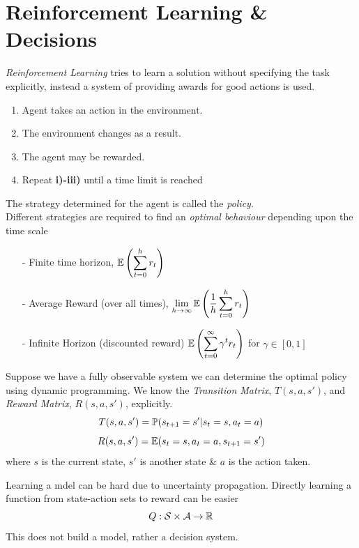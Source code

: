 \documentclass[11pt,a4paper]{article}
\begin{document}
\section{Reinforcement Learning \& Decisions}

\textit{Reinforcement Learning} tries to learn a solution without specifying the task explicitly, instead a system of providing awards for good actions is used.\\

\begin{enumerate}[label=\roman*)]
	\item Agent takes an action in the environment.
	\item The environment changes as a result.
	\item The agent may be rewarded.
	\item Repeat \textbf{i)-iii)} until a time limit is reached
\end{enumerate}
\nb The strategy determined for the agent is called the \textit{policy}.\\

Different strategies are required to find an \textit{optimal behaviour} depending upon the time scale
\begin{itemize}
	\item[-] Finite time horizon, ${\displaystyle\mathbb{E}\left(\sum_{t=0}^hr_t\right)}$
	\item[-] Average Reward (over all times), ${\displaystyle\lim_{h\to\infty}\mathbb{E}\left(\frac{1}{h}\sum_{t=0}^hr_t\right)}$
	\item[-] Infinite Horizon (discounted reward) ${\displaystyle\mathbb{E}\left(\sum_{t=0}^\infty\gamma^tr_t\right)}$ for $\gamma\in[0,1]$
\end{itemize}

Suppose we have a fully observable system we can determine the optimal policy using dynamic programming. \ie We know the \textit{Transition Matrix}, $T(s,a,s')$, and \textit{Reward Matrix}, $R(s,a,s')$, explicitly.
$$T(s,a,s')=\mathbb{P}(s_{t+1}=s'|s_t=s,a_t=a)$$
$$R(s,a,s')=\mathbb{E}(s_t=s,a_t=a,s_{t+1}=s')$$
where $s$ is the current state, $s'$ is another state \& $a$ is the action taken.\\


Learning a mdel can be hard due to uncertainty propagation. Directly learning a function from state-action sets to reward can be easier
$$Q:\mathcal{S}\times\mathcal{A}\to\mathbb{R}$$
\nb This does not build a model, rather a decision system.\\
\end{document}
